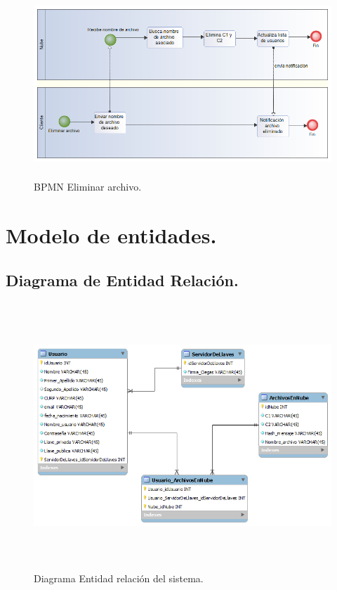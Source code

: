 \begin{figure}[H]
\centering
\includegraphics[width=16cm, height=7cm]{./images/BPM_Eliminar.png}
\caption{BPMN Eliminar archivo.}

\end{figure} 

\newpage
\section{Modelo de entidades. }

\subsection{Diagrama de Entidad Relación. }

\begin{figure}[H]
\centering
\includegraphics[width=16cm, height=10cm]{./images/BDTT2.png}
\caption{Diagrama Entidad relación del sistema.}

\end{figure} 

